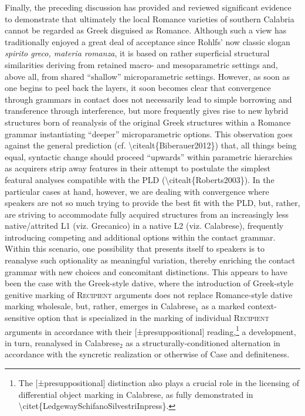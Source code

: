 \documentclass[12pt]{article}
\newcommand\textsubscript[1]{\ensuremath{{}_{\text{#1}}}}
\newenvironment{styleStandard}{\setlength\leftskip{0cm}\setlength\rightskip{0cm plus 1fil}\setlength\parindent{0cm}\setlength\parfillskip{0pt plus 1fil}\setlength\parskip{0cm plus 1pt}\writerlistparindent\writerlistleftskip\leavevmode\normalfont\normalsize\writerlistlabel\ignorespaces}{\unskip\vspace{0cm plus 1pt}\par}
\newcommand\writerlistleftskip{}
\newcommand\writerlistparindent{}
\newcommand\writerlistlabel{}
\begin{document}
\begin{styleStandard}
Finally, the preceding discussion has provided and reviewed significant evidence to demonstrate that ultimately the local Romance varieties of southern Calabria cannot be regarded as Greek disguised as Romance. Although such a view has traditionally enjoyed a great deal of acceptance since Rohlfs’ now classic slogan \textit{spirito greco, materia romanza}, it is based on rather superficial structural similarities deriving from retained macro- and mesoparametric settings and, above all, from shared “shallow” microparametric settings. However, as soon as one begins to peel back the layers, it soon becomes clear that convergence through grammars in contact does not necessarily lead to simple borrowing and transference through interference, but more frequently gives rise to new hybrid structures born of reanalysis of the original Greek structures within a Romance grammar instantiating “deeper” microparametric options. This observation goes against the general prediction (cf. {\textbackslash}citealt\{Biberauer2012\}) that, all things being equal, syntactic change should proceed “upwards” within parametric hierarchies as acquirers strip away features in their attempt to postulate the simplest featural analyses compatible with the PLD ({\textbackslash}citealt\{Roberts2003\}). In the particular cases at hand, however, we are dealing with convergence where speakers are not so much trying to provide the best fit with the PLD, but, rather, are striving to accommodate fully acquired structures from an increasingly less native/attrited L1 (viz. Grecanico) in a native L2 (viz. Calabrese), frequently introducing competing and additional options within the contact grammar. Within this scenario, one possibility that presents itself to speakers is to reanalyse such optionality as meaningful variation, thereby enriching the contact grammar with new choices and concomitant distinctions. This appears to have been the case with the Greek-style dative, where the introduction of Greek-style genitive marking of R\textsc{ecipient} arguments does not replace Romance-style dative marking wholesale, but, rather, emerges in Calabrese\textsubscript{1} as a marked context-sensitive option that is specialized in the marking of individual \textsc{Recipient} arguments in accordance with their [±presuppositional] reading,\footnote{ The [±presuppositional] distinction also plays a crucial role in the licensing of differential object marking in Calabrese, as fully demonstrated in {\textbackslash}citet\{LedgewaySchifanoSilvestriInpress\}.} a development, in turn, reanalysed in Calabrese\textsubscript{2} as a structurally-conditioned alternation in accordance with the syncretic realization or otherwise of Case and definiteness.
\end{styleStandard}
\end{document}
